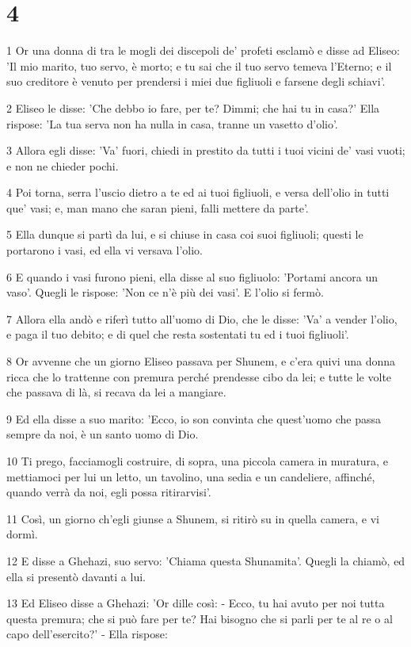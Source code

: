 \chapter{4}

\par 1 Or una donna di tra le mogli dei discepoli de' profeti esclamò e disse ad Eliseo: 'Il mio marito, tuo servo, è morto; e tu sai che il tuo servo temeva l'Eterno; e il suo creditore è venuto per prendersi i miei due figliuoli e farsene degli schiavi'.
\par 2 Eliseo le disse: 'Che debbo io fare, per te? Dimmi; che hai tu in casa?' Ella rispose: 'La tua serva non ha nulla in casa, tranne un vasetto d'olio'.
\par 3 Allora egli disse: 'Va' fuori, chiedi in prestito da tutti i tuoi vicini de' vasi vuoti; e non ne chieder pochi.
\par 4 Poi torna, serra l'uscio dietro a te ed ai tuoi figliuoli, e versa dell'olio in tutti que' vasi; e, man mano che saran pieni, falli mettere da parte'.
\par 5 Ella dunque si partì da lui, e si chiuse in casa coi suoi figliuoli; questi le portarono i vasi, ed ella vi versava l'olio.
\par 6 E quando i vasi furono pieni, ella disse al suo figliuolo: 'Portami ancora un vaso'. Quegli le rispose: 'Non ce n'è più dei vasi'. E l'olio si fermò.
\par 7 Allora ella andò e riferì tutto all'uomo di Dio, che le disse: 'Va' a vender l'olio, e paga il tuo debito; e di quel che resta sostentati tu ed i tuoi figliuoli'.
\par 8 Or avvenne che un giorno Eliseo passava per Shunem, e c'era quivi una donna ricca che lo trattenne con premura perché prendesse cibo da lei; e tutte le volte che passava di là, si recava da lei a mangiare.
\par 9 Ed ella disse a suo marito: 'Ecco, io son convinta che quest'uomo che passa sempre da noi, è un santo uomo di Dio.
\par 10 Ti prego, facciamogli costruire, di sopra, una piccola camera in muratura, e mettiamoci per lui un letto, un tavolino, una sedia e un candeliere, affinché, quando verrà da noi, egli possa ritirarvisi'.
\par 11 Così, un giorno ch'egli giunse a Shunem, si ritirò su in quella camera, e vi dormì.
\par 12 E disse a Ghehazi, suo servo: 'Chiama questa Shunamita'. Quegli la chiamò, ed ella si presentò davanti a lui.
\par 13 Ed Eliseo disse a Ghehazi: 'Or dille così: - Ecco, tu hai avuto per noi tutta questa premura; che si può fare per te? Hai bisogno che si parli per te al re o al capo dell'esercito?' - Ella rispose:
